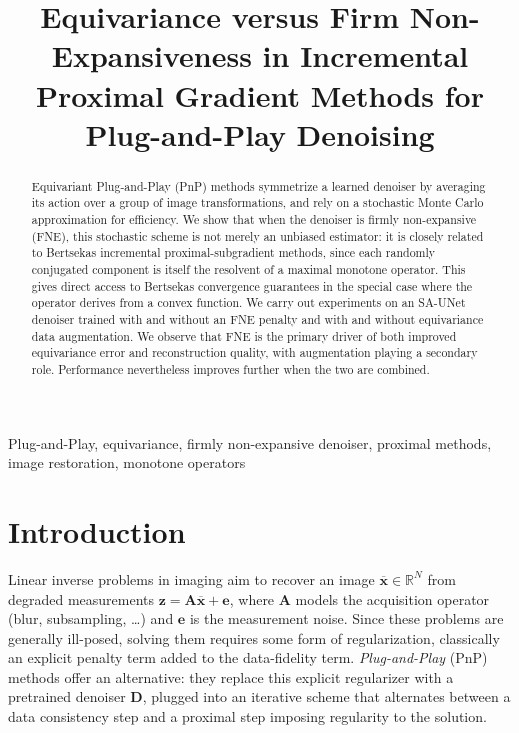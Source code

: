 \documentclass{article}
\title{Equivariance versus Firm Non-Expansiveness in Incremental Proximal Gradient Methods for Plug-and-Play Denoising}
\newcommand{\R}{\mathbb{R}}
\newcommand{\xb}{\mathbf{x}}
\newcommand{\Ab}{\mathbf{A}}
\newcommand{\zb}{\mathbf{z}}
\newcommand{\eb}{\mathbf{e}}
\begin{document}
\maketitle

\begin{abstract}
Equivariant Plug-and-Play (PnP) methods symmetrize a learned denoiser by
averaging its action over a group of image transformations, and rely on a
stochastic Monte Carlo approximation for efficiency. We show that when the
denoiser is firmly non-expansive (FNE), this stochastic scheme is not
merely an unbiased estimator: it is closely related to Bertsekas
incremental proximal-subgradient methods, since each randomly conjugated
component is itself the resolvent of a maximal monotone operator. This
gives direct access to Bertsekas convergence guarantees in the special
case where the operator derives from a convex function. We carry out experiments on an SA-UNet denoiser trained with and without an
FNE penalty and with and without equivariance data augmentation. We observe that FNE is the primary driver of both improved equivariance error and reconstruction quality, with augmentation playing a secondary role. Performance nevertheless improves further when the two are combined.
\end{abstract}

\begin{keywords}
Plug-and-Play, equivariance, firmly non-expansive denoiser, proximal methods, image restoration, monotone operators
\end{keywords}
\vspace{-0.1cm}

\section{Introduction}
\label{sec:introduction}
\vspace{-0.1cm}

Linear inverse problems in imaging aim to recover an image $\overline{\xb} \in \R^N$
from degraded measurements $\zb = \Ab\overline{\xb} + \eb$, where $\Ab$ models the
acquisition operator (blur, subsampling, \dots) and $\eb$ is the measurement
noise. Since these problems are generally ill-posed, solving them
requires some form of regularization, classically an explicit penalty
term added to the data-fidelity term. \emph{Plug-and-Play} (PnP)
methods offer an alternative: they replace this explicit regularizer
with a pretrained denoiser $\mathbf{D}$, plugged into an iterative
scheme that alternates between a data consistency step and a proximal step imposing regularity to the solution. 
\end{document}
